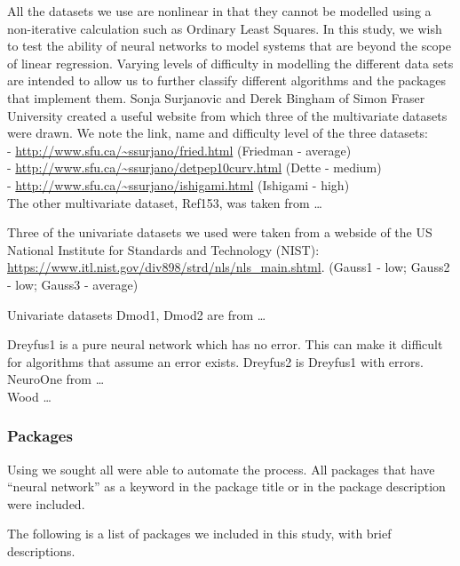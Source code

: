All the datasets we use are nonlinear in that they cannot be modelled
using a non-iterative calculation such as Ordinary Least Squares. In
this study, we wish to test the ability of neural networks to model
systems that are beyond the scope of linear regression. Varying levels
of difficulty in modelling the different data sets are intended to allow
us to further classify different algorithms and the packages that
implement them. Sonja Surjanovic and Derek Bingham of Simon Fraser
University created a useful website from which three of the multivariate
datasets were drawn. We note the link, name and difficulty level of the
three datasets:\\
- \url{http://www.sfu.ca/~ssurjano/fried.html} (Friedman - average)\\
- \url{http://www.sfu.ca/~ssurjano/detpep10curv.html} (Dette - medium)\\
- \url{http://www.sfu.ca/~ssurjano/ishigami.html} (Ishigami - high)\\
The other multivariate dataset, Ref153, was taken from \ldots{}

Three of the univariate datasets we used were taken from a webside of
the US National Institute for Standards and Technology (NIST):
\url{https://www.itl.nist.gov/div898/strd/nls/nls_main.shtml}. (Gauss1 -
low; Gauss2 - low; Gauss3 - average)

Univariate datasets Dmod1, Dmod2 are from \ldots{}

Dreyfus1 is a pure neural network which has no error. This can make it
difficult for algorithms that assume an error exists. Dreyfus2 is
Dreyfus1 with errors. NeuroOne from \ldots{}\\
Wood \ldots{}

\hypertarget{packages}{%
\subsubsection{Packages}\label{packages}}

Using  \citep{R-RWsearch} we sought all were able to
automate the process. All packages that have ``neural network'' as a
keyword in the package title or in the package description were
included.

The following is a list of packages we included in this study, with
brief descriptions.

